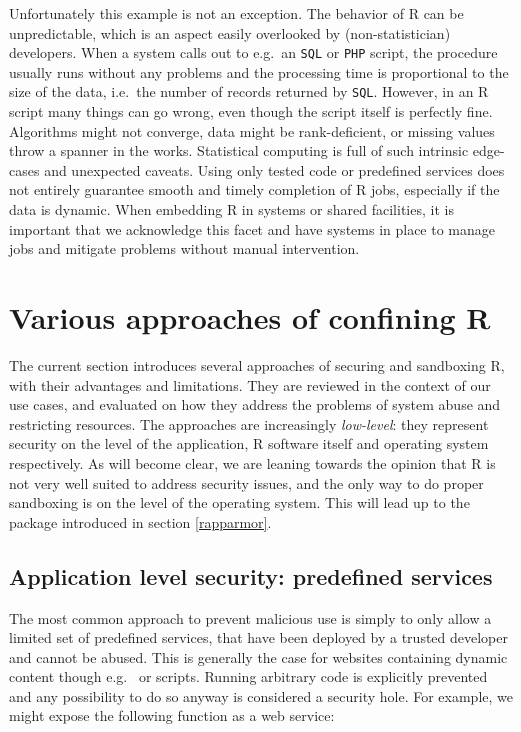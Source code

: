 \documentclass{jss}
\newcommand{\R}{\textsf{R}\xspace}
\newcommand{\RAppArmor}{\pkg{RAppArmor}\xspace}
\begin{document}
Unfortunately this example is not an exception. The behavior of \R can be
unpredictable, which is an aspect easily overlooked by (non-statistician)
developers. When a system calls out to e.g.\ an \texttt{SQL} or \texttt{PHP}
script, the procedure usually runs without any problems and the processing time
is proportional to the size of the data, i.e.\ the number of records returned by
\texttt{SQL}. However, in an \R script many things can go wrong, even though the
script itself is perfectly fine.  Algorithms might not converge, data might be
rank-deficient, or missing values throw a spanner in the works.
Statistical computing is full of such intrinsic edge-cases and unexpected
caveats.
Using only tested code or predefined services does not entirely guarantee smooth
and timely completion of \R jobs, especially if the data is dynamic. When
embedding \R in systems or shared facilities, it is important that we
acknowledge this facet and have systems in place to manage jobs and mitigate
problems without manual intervention.

\section[Various approaches of confining R]{Various approaches of confining
\R}

The current section introduces several approaches of securing and sandboxing \R,
with their advantages and limitations. They are reviewed in the context of our
use cases, and evaluated on how they address the problems of system abuse and
restricting resources. The approaches are increasingly \emph{low-level}: they
represent security on the level of the application, R software itself and
operating system respectively. As will become clear, we are leaning towards the
opinion that \R is not very well suited to address security issues, and the only
way to do proper sandboxing is on the level of the operating system. This will
lead up to the \RAppArmor package introduced in section \ref{rapparmor}.


\subsection{Application level security: predefined services}

The most common approach to prevent malicious use is simply to only allow a
limited set of predefined services, that have been deployed by a trusted
developer and cannot be abused. This is generally the case for websites
containing dynamic content though e.g.\  or 
scripts.
Running arbitrary code is explicitly prevented and any possibility to do so
anyway is considered a security hole. For example, we might expose the following
function as a web service:
\end{document}
